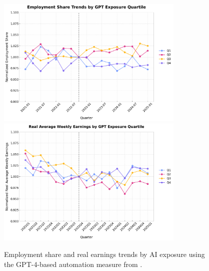 \documentclass[12pt]{article}
\numberwithin{equation}{section}
\theoremstyle{theorem}\newcustomtheorem{theorem}{{\bf\sc Theorem}}
\theoremstyle{definition}\newcustomtheorem{assumption}{{\bf\sc Assumption}}
\theoremstyle{theorem} \newcustomtheorem{proposition}{{\bf\sc Proposition}}
\begin{document}
\begin{figure}[htbp]
	\centering
  \includegraphics[width=0.8\textwidth]{../figures/employment_share_by_automation_quartile_2021Q1.pdf}
  \includegraphics[width=0.8\textwidth]{../figures/real_earnings_by_automation_quartile_2021Q1.pdf}
	\caption{Employment share and real earnings trends by AI exposure using the GPT-4-based automation measure from \citet{eloundou_gpts_2023}.}
	\label{fig:employment_trends_automation}
\end{figure}
\end{document}

